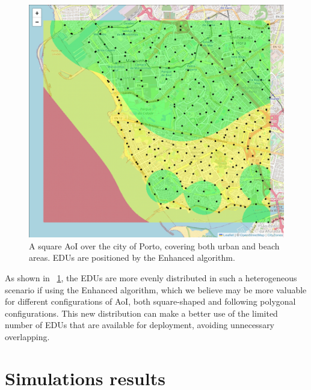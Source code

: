 \begin{refsection}
\begin{figure}[!ht]
  \centering
  \includegraphics[width=0.7\linewidth]{Chapters/5-AoM/img/porto_oceano_restricted_plus.png}
  \caption{A square AoI over the city of Porto, covering both urban and beach areas. EDUs are positioned by the Enhanced algorithm.}\label{fig:porto_oceano_restricted_plus}
\end{figure}

As shown in \figurename~\ref{fig:porto_oceano_restricted_plus}, the EDUs are more evenly distributed in such a heterogeneous scenario if using the Enhanced algorithm, which we believe may be more valuable for different configurations of AoI, both square-shaped and following polygonal configurations. This new distribution can make a better use of the limited number of EDUs that are available for deployment, avoiding unnecessary overlapping.



\section{Simulations results}\label{sec:simulation}



\end{refsection}
